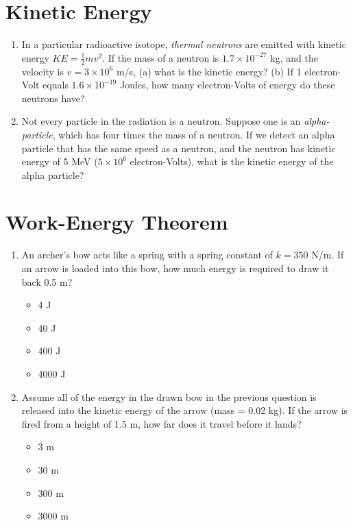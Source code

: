 \documentclass[10pt]{article}
\begin{document}
\section{Kinetic Energy}
\begin{enumerate}
\item In a particular radioactive isotope, \textit{thermal neutrons} are emitted with kinetic energy $KE = \frac{1}{2}mv^2$.  If the mass of a neutron is $1.7\times 10^{-27}$ kg, and the velocity is $v = 3\times 10^6$ m/s, (a) what is the kinetic energy? (b) If 1 electron-Volt equals $1.6 \times 10^{-19}$ Joules, how many electron-Volts of energy do these neutrons have? \\ \vspace{2cm}
\item Not every particle in the radiation is a neutron.  Suppose one is an \textit{alpha-particle}, which has four times the mass of a neutron.  If we detect an alpha particle that has the same speed as a neutron, and the neutron has kinetic energy of 5 MeV ($5 \times 10^{6}$ electron-Volts), what is the kinetic energy of the alpha particle? \\ \vspace{2cm}
\end{enumerate}
\section{Work-Energy Theorem}
\begin{enumerate}
\item An archer's bow acts like a spring with a spring constant of $k=350$ N/m.  If an arrow is loaded into this bow, how much energy is required to draw it back 0.5 m?
\begin{itemize}
\item 4 J
\item 40 J
\item 400 J
\item 4000 J
\end{itemize}
\item Assume all of the energy in the drawn bow in the previous question is released into the kinetic energy of the arrow (mass = 0.02 kg).  If the arrow is fired from a height of 1.5 m, how far does it travel before it lands?
\begin{itemize}
\item 3 m
\item 30 m
\item 300 m
\item 3000 m
\end{itemize}
\end{enumerate}
\end{document}
